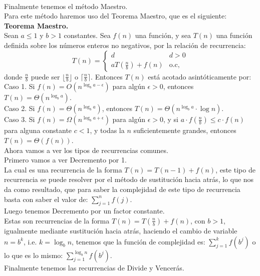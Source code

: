 \documentclass[12pt,twoside]{article}
\begin{document}
\\ Finalmente tenemos el método Maestro.
\\ Para este método haremos uso del Teorema Maestro, que es el siguiente:
\\ \textbf{Teorema Maestro.}
\\ Sean $a \leq 1$ y $b>1$ constantes. Sea $f(n)$ una función, y sea $T(n)$ una función definida sobre los números enteros no negativos, por la relación de recurrencia:
\begin{equation}
    T(n)=
    \begin{cases}
        d &\text{$d>0$} \\
        aT(\frac{n}{b})+f(n) &\text{o.c,}
    \end{cases}
\end{equation}
donde $\frac{n}{b}$ puede ser $\lfloor \frac{n}{b} \rfloor$ o $\lceil \frac{n}{b} \rceil$. Entonces $T(n)$ está acotado asintóticamente por:
\\ Caso 1. Si $f(n)= O(n^{\log_ba-\epsilon})$ para algún $\epsilon>0$, entonces $T(n)=\Theta(n^{\log_ba})$.
\\ Caso 2. Si $f(n)= \Theta(n^{\log_ba})$, entonces $T(n)=\Theta(n^{\log_ba}\cdot \log n)$.
\\ Caso 3. Si $f(n)= \Omega(n^{\log_ba+\epsilon})$ para algún $\epsilon>0$, y si $a\cdot f(\frac{n}{b})\leq c\cdot f(n)$ para alguna constante $c<1$, y todas la $n$ suficientemente grandes, entonces $T(n)=\Theta(f(n))$.
\newline
\\ Ahora vamos a ver los tipos de recurrencias comunes.
\\ Primero vamos a ver Decremento por 1.
\\ La cual es una recurrencia de la forma $T(n)=T(n-1)+f(n)$, este tipo de recurrencia se puede resolver por el método de sustitución hacia atrás, lo que nos da como resultado, que para saber la complejidad de este tipo de recurrencia basta con saber el valor de: $\sum_{j=1}^{n} f(j)$.
\newline
\\ Luego tenemos Decremento por un factor constante.
\\ Estas son recurrencias de la forma $T(n)=T(\frac{n}{b})+f(n)$, con $b>1$, igualmente mediante sustitución hacia atrás, haciendo el cambio de variable $n=b^k$, i.e. $k=\log_bn$, tenemos que la función de complejidad es:  $\sum_{j=1}^{k} f(b^j)$ o lo que es lo mismo:  $\sum_{j=1}^{\log_bn} f(b^j)$.
\newline
\\ Finalmente tenemos las recurrencias de Divide y Vencerás.
\end{document}
